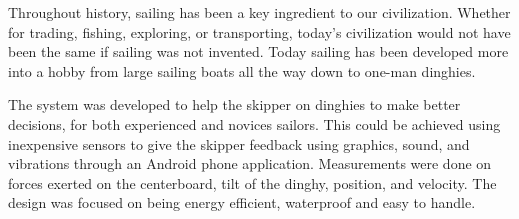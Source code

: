 Throughout history, sailing has been a key ingredient to our civilization. Whether for trading, fishing, exploring, or transporting, today's civilization would not have been the same if sailing was not invented. Today sailing has been developed more into a hobby from large sailing boats all the way down to one-man dinghies. 

The \project system was developed to help the skipper on dinghies to make better decisions, for both experienced and novices sailors. This could be achieved using inexpensive sensors to give the skipper feedback using graphics, sound, and vibrations through an Android phone application. Measurements were done on forces exerted on the centerboard, tilt of the dinghy, position, and velocity. The design was focused on being energy efficient, waterproof and easy to handle.
